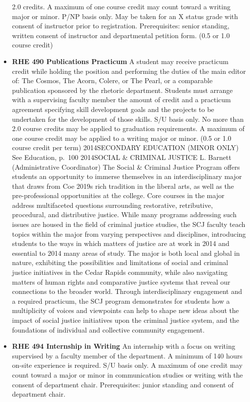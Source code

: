 \documentclass[
  letterpaper,
]{scrbook}
\begin{document}
\begin{itemize}
  2.0 credits. A maximum of one course credit may count toward a writing
  major or minor. P/NP basis only. May be taken for an X status grade
  with consent of instructor prior to registration. Prerequisites:
  senior standing, written consent of instructor and departmental
  petition form. (0.5 or 1.0 course credit)\\
\item
  \textbf{RHE 490 Publications Practicum} A student may receive
  practicum credit while holding the position and performing the duties
  of the main editor of: The Cosmos, The Acorn, Colere, or The Pearl, or
  a comparable publication sponsored by the rhetoric department.
  Students must arrange with a supervising faculty member the amount of
  credit and a practicum agreement specifying skill development goals
  and the projects to be undertaken for the development of those skills.
  S/U basis only. No more than 2.0 course credits may be applied to
  graduation requirements. A maximum of one course credit may be applied
  to a writing major or minor. (0.5 or 1.0 course credit per term)
  2014SECONDARY EDUCATION (MINOR ONLY) See Education, p.~100 2014SOCIAL
  \& CRIMINAL JUSTICE L. Barnett (Administrative Coordinator) The Social
  \& Criminal Justice Program offers students an opportunity to immerse
  themselves in an interdisciplinary major that draws from Coe 2019s
  rich tradition in the liberal arts, as well as the pre-professional
  opportunities at the college. Core courses in the major address
  multifaceted questions surrounding restorative, retributive,
  procedural, and distributive justice. While many programs addressing
  such issues are housed in the field of criminal justice studies, the
  SCJ faculty teach topics within the major from varying perspectives
  and disciplines, introducing students to the ways in which matters of
  justice are at work in 2014 and essential to 2014 many areas of study.
  The major is both local and global in nature, exhibiting the
  possibilities and limitations of social and criminal justice
  initiatives in the Cedar Rapids community, while also navigating
  matters of human rights and comparative justice systems that reveal
  our connections to the broader world. Through interdisciplinary
  engagement and a required practicum, the SCJ program demonstrates for
  students how a multiplicity of voices and viewpoints can help to shape
  new ideas about the impact of social justice initiatives upon the
  criminal justice system, and the foundations of individual and
  collective community engagement.
\item
  \textbf{RHE 494 Internship in Writing} An internship with a focus on
  writing supervised by a faculty member of the department. A minimum of
  140 hours on-site experience is required. S/U basis only. A maximum of
  one credit may count toward a major or minor in communication studies
  or writing with the consent of department chair. Prerequisites: junior
  standing and consent of department chair.
\end{itemize}
\end{document}
